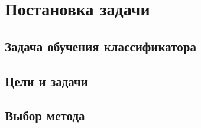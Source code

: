 \newpage

\section{Постановка задачи}

\subsection{Задача обучения классификатора}

\subsection{Цели и задачи}

\subsection{Выбор метода}